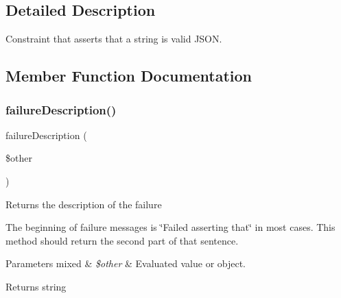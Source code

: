 \subsection{Detailed Description}
Constraint that asserts that a string is valid J\+S\+ON. 

\subsection{Member Function Documentation}
\mbox{\label{class_p_h_p_unit___framework___constraint___is_json_aaabb679273bfb812df4d81c283754a59}} 
\subsubsection{\texorpdfstring{failure\+Description()}{failureDescription()}}
{\footnotesize\ttfamily failure\+Description (\begin{DoxyParamCaption}\item[{}]{\$other }\end{DoxyParamCaption})\hspace{0.3cm}{\ttfamily [protected]}}

Returns the description of the failure

The beginning of failure messages is \char`\"{}\+Failed asserting that\char`\"{} in most cases. This method should return the second part of that sentence.


\begin{DoxyParams}[1]{Parameters}
mixed & {\em \$other} & Evaluated value or object.\\
\hline
\end{DoxyParams}
\begin{DoxyReturn}{Returns}
string 
\end{DoxyReturn}
\mbox{\label{class_p_h_p_unit___framework___constraint___is_json_a9c9c337de483bbdbb9fa249a6c7c9cc5}} 

